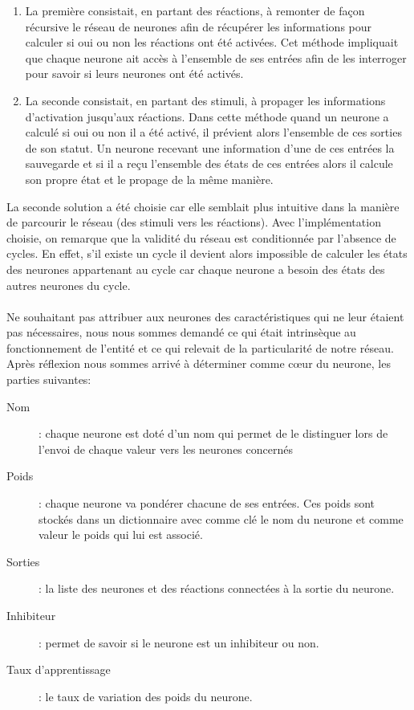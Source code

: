 \begin{enumerate}
  \item La première consistait, en partant des réactions, à remonter de façon
    récursive le réseau de neurones afin de récupérer les informations pour
    calculer si oui ou non les réactions ont été activées. Cet méthode impliquait
    que chaque neurone ait accès à l'ensemble de ses entrées afin de les
    interroger pour savoir si leurs neurones ont été activés.
  \item La seconde consistait, en partant des stimuli, à propager les informations
    d'activation jusqu'aux réactions. Dans cette méthode quand un neurone a calculé
    si oui ou non il a été activé, il prévient alors l'ensemble de ces sorties de
    son statut. Un neurone recevant une information d'une de ces entrées la
    sauvegarde et si il a reçu l'ensemble des états de ces entrées alors il
    calcule son propre état et le propage de la même manière.
\end{enumerate}

La seconde solution a été choisie car elle semblait plus intuitive dans la
manière de parcourir le réseau (des stimuli vers les réactions). Avec
l'implémentation choisie, on remarque que la validité du réseau est
conditionnée par l'absence de cycles. En effet, s'il existe un cycle il
devient alors impossible de calculer les états des neurones appartenant au
cycle car chaque neurone a besoin des états des autres neurones du cycle.

\paragraph{}
Ne souhaitant pas attribuer aux neurones des caractéristiques qui ne leur étaient
pas nécessaires, nous nous sommes demandé ce qui était intrinsèque au
fonctionnement de l'entité et ce qui relevait de la particularité de notre
réseau. Après réflexion nous sommes arrivé à déterminer comme cœur du neurone, les
parties suivantes:\\

\begin{description}
  \item[Nom]: chaque neurone est doté d'un nom qui permet de le distinguer
    lors de l'envoi de chaque valeur vers les neurones concernés
  \item[Poids]: chaque neurone va pondérer chacune de ses entrées. Ces poids
    sont stockés dans un dictionnaire avec comme clé le nom du neurone et
    comme valeur le poids qui lui est associé.
  \item[Sorties]: la liste des neurones et des réactions connectées à la
    sortie du neurone.
  \item[Inhibiteur]: permet de savoir si le neurone est un inhibiteur ou non.
  \item[Taux d'apprentissage]: le taux de variation des poids du neurone.
\end{description}

